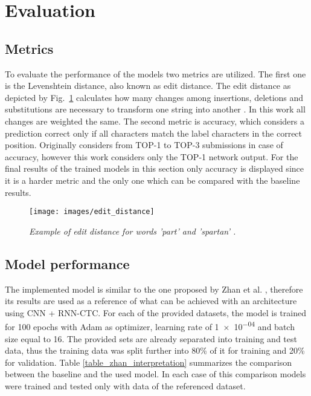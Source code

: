 \section{Evaluation}\label{sec:evaluation}

\subsection{Metrics}

To evaluate the performance of the models two metrics are utilized. The first
one is the Levenshtein distance, also known as edit distance. The edit distance
as depicted by Fig.~\ref{fig_edit_distance} calculates how many changes among
insertions, deletions and substitutions are necessary to transform one string
into another \cite{rice_edit_dist}. In this work all changes are weighted the
same. The second metric is accuracy, which considers a prediction correct only
if all characters match the label characters in the correct position. Originally
\cite{icfhr_competition} considers from TOP-1 to TOP-3 submissions in case of
accuracy, however this work considers only the TOP-1 network output. For the
final results of the trained models in this section only accuracy is displayed
since it is a harder metric and the only one which can be compared with the
baseline results. 

\begin{figure}[t]
\centerline{\texttt{[image: images/edit\_distance]}}
\caption{{\it Example of edit distance for words 'part' and 'spartan' \cite{rice_edit_dist}.}}  
\label{fig_edit_distance}
\end{figure}

\subsection{Model performance}

The implemented model is similar to the one proposed by Zhan et al.
\cite{zhan2017}, therefore its results are used as a reference of what can be
achieved with an architecture using CNN + RNN-CTC. For each of the provided
datasets, the model is trained for 100 epochs with Adam as optimizer, learning
rate of \num{1e-04} and batch size equal to 16. The provided sets are already
separated into training and test data, thus the training data was split further
into 80\% of it for training and 20\% for validation. Table
\ref{table_zhan_interpretation} summarizes the comparison between the baseline
and the used model. In each case of this comparison models were trained and
tested only with data of the referenced dataset. 

